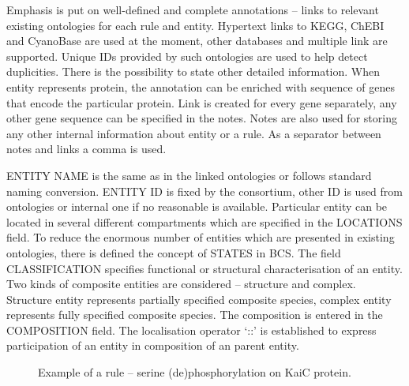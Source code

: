 \documentclass{elsarticle}
\begin{document}
Emphasis is put on well-defined and complete annotations – links to relevant existing ontologies for each rule and entity. Hypertext links to KEGG, ChEBI and CyanoBase are used at the moment, other databases and multiple link are supported. Unique IDs provided by such ontologies are used to help detect duplicities. There is the possibility to state other detailed information. When entity represents protein, the annotation can be enriched with sequence of genes that encode the particular protein. Link is created for every gene separately, any other gene sequence can be specified in the notes. Notes are also used for storing any other internal information about entity or a rule. As a separator between notes and links a comma is used. 

ENTITY NAME is the same as in the linked ontologies or follows standard naming conversion. ENTITY ID is fixed by the consortium, other ID is used from ontologies or internal one if no reasonable is available. Particular entity can be located in several different compartments which are specified in the LOCATIONS field. To reduce the enormous number of entities which are presented in existing ontologies, there is defined the concept of STATES in BCS. The field CLASSIFICATION specifies functional or structural characterisation of an entity. Two kinds of composite entities are considered -- structure and complex. Structure entity represents partially specified composite species, complex entity represents fully specified composite species. The composition is entered in the COMPOSITION field. The localisation operator `::' is established to express participation of an entity in composition of an parent entity.

\begin{figure}
\begin{center}
\end{center}
\caption{Example of a rule -- serine (de)phosphorylation on KaiC protein.}\label{clockrule1}
\end{figure}
\end{document}
